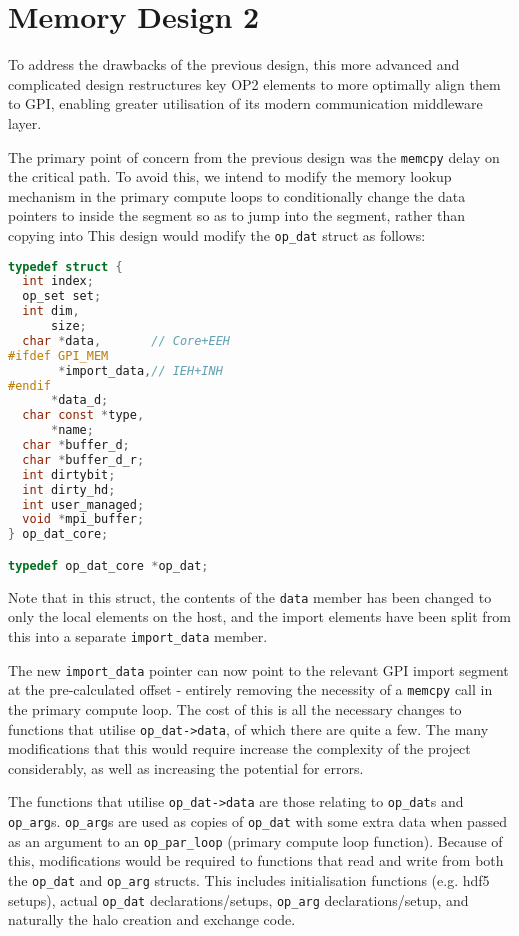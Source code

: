\section{Memory Design 2}
To address the drawbacks of the previous design, this more advanced and complicated design restructures key OP2 elements to more optimally align them to GPI, enabling greater utilisation of its modern communication middleware layer. 

The primary point of concern from the previous design was the \texttt{memcpy} delay on the critical path. To avoid this, we intend to modify the memory lookup mechanism in the primary compute loops to conditionally change the data pointers to inside the segment so as to jump into the segment, rather than copying into 
This design would modify the \texttt{op\_dat} struct as follows:

\begin{lstlisting}[language=C]
typedef struct {
  int index;
  op_set set; 
  int dim, 
      size;
  char *data,       // Core+EEH
#ifdef GPI_MEM
       *import_data,// IEH+INH
#endif
      *data_d;      
  char const *type, 
      *name;        
  char *buffer_d;   
  char *buffer_d_r; 
  int dirtybit;     
  int dirty_hd;     
  int user_managed; 
  void *mpi_buffer; 
} op_dat_core;

typedef op_dat_core *op_dat;
\end{lstlisting}

Note that in this struct, the contents of the \texttt{data} member has been changed to only the local elements on the host, and the import elements have been split from this into a separate \texttt{import\_data} member.

The new \texttt{import\_data} pointer can now point to the relevant GPI import segment at the pre-calculated offset - entirely removing the necessity of a \texttt{memcpy} call in the primary compute loop. The cost of this is all the necessary changes to functions that utilise \texttt{op\_dat->data}, of which there are quite a few. The many modifications that this would require increase the complexity of the project considerably, as well as increasing the potential for errors.

The functions that utilise \texttt{op\_dat->data} are those relating to \texttt{op\_dat}s and \texttt{op\_arg}s. \texttt{op\_arg}s are used as copies of \texttt{op\_dat} with some extra data when passed as an argument to an \texttt{op\_par\_loop} (primary compute loop function). Because of this, modifications would be required to functions that read and write from both the \texttt{op\_dat} and \texttt{op\_arg} structs. This includes initialisation functions (e.g. hdf5 setups), actual \texttt{op\_dat} declarations/setups, \texttt{op\_arg} declarations/setup, and naturally the halo creation and exchange code. 

